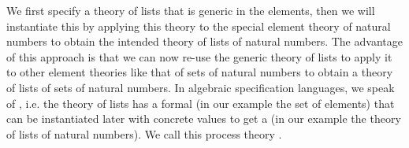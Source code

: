 We first specify a theory of lists that is generic in the elements, then we will
instantiate this by applying this theory to the special element theory of natural
numbers to obtain the intended theory of lists of natural numbers. The advantage
of this approach is that we can now re-use the generic theory of lists to apply it
to other element theories like that of sets of natural numbers to obtain a theory
of lists of sets of natural numbers.  In algebraic specification languages, we
speak of {}, i.e. the theory of lists has a formal
{} (in our example the set of elements) that can be
instantiated later with concrete values to get a {} (in our example the theory of lists of
natural numbers). We call this process theory {}.

